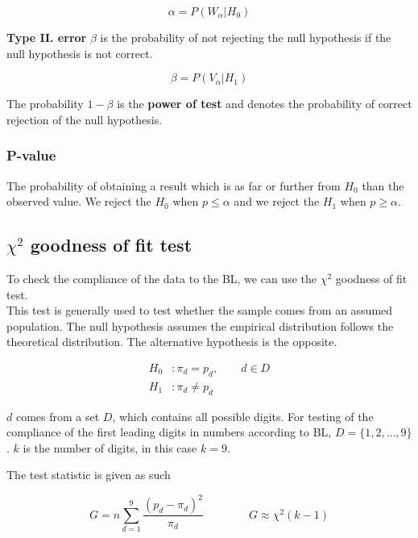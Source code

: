 \begin{equation}
    \alpha = P(W_\alpha | H_0)
\end{equation}

\textbf{Type II. error} $\beta$ is the probability of not rejecting the null hypothesis if the null hypothesis is not correct. 

\begin{equation}
    \beta = P(V_\alpha | H_1)
\end{equation}

The probability $1-\beta$ is the \textbf{power of test} and denotes the probability of correct rejection of the null hypothesis. 

\subsubsection*{P-value}

The probability of obtaining a result which is as far or further from $H_{0}$ than the observed value. We reject the $H_{0}$ when  $p \le \alpha$ and we reject the $H_{1}$ when $p \ge \alpha$.

\subsection{$\chi^2$ goodness of fit test}

To check the compliance of the data to the BL, we can use the $\chi^2$ goodness of fit test. \\ This test is generally used to test whether the sample comes from an assumed population. The null hypothesis assumes the empirical distribution follows the theoretical distribution. The alternative hypothesis is the opposite. 

\begin{equation}
\begin{aligned}
    H_0&: \pi_d = p_d, \qquad d \in D\\
    H_1&: \pi_d \ne p_d
\end{aligned}
\end{equation}

$d$ comes from a set $D$, which contains all possible digits. For testing of the compliance of the first leading digits in numbers according to BL, $D = \{1,2,\dots,9\}$. $k$ is the number of digits, in this case $k = 9$.

The test statistic is given as such  

\begin{equation}
    \label{chi-sq-test}
    G= n \sum\limits_{d=1}^{9} \frac{(p_d -\pi_d)^2}{\pi_d} \qquad \qquad  G \approx \chi^2(k-1) 
\end{equation}

